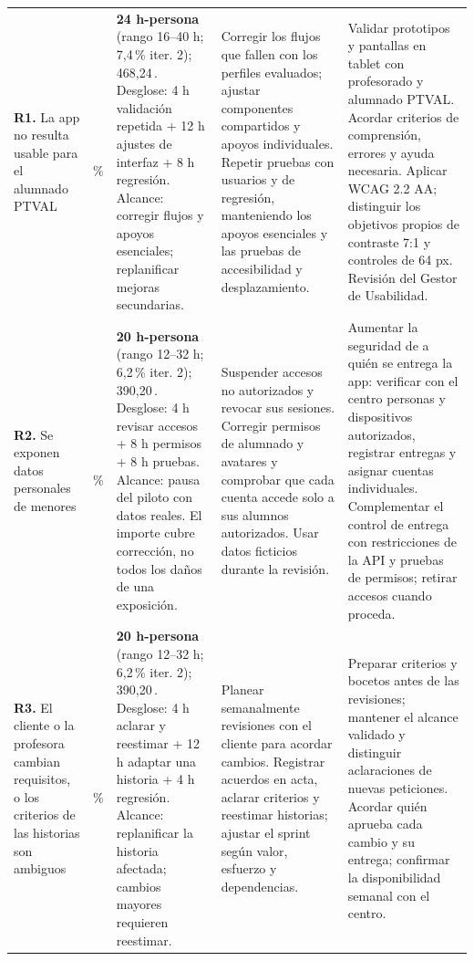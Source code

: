 \documentclass[a4paper,10pt]{article}
\newcommand{\eu}{\,\texteuro}
\begin{document}
\begin{landscape}
{\begin{longtable}{@{}>{\raggedright\arraybackslash}p{3.4cm}>{\raggedleft\arraybackslash}p{2.1cm}>{\raggedright\arraybackslash}p{5.2cm}>{\raggedright\arraybackslash}p{6.55cm}>{\raggedright\arraybackslash}p{6.55cm}@{}}
\textbf{R1.} La app no resulta usable para el alumnado PTVAL
& 50\,\%
& \textbf{24 h-persona} (rango 16--40 h; 7,4\,\% iter. 2); 468,24\eu{}. Desglose: 4 h validación repetida + 12 h ajustes de interfaz + 8 h regresión. Alcance: corregir flujos y apoyos esenciales; replanificar mejoras secundarias.
& Corregir los flujos que fallen con los perfiles evaluados; ajustar componentes compartidos y apoyos individuales. Repetir pruebas con usuarios y de regresión, manteniendo los apoyos esenciales y las pruebas de accesibilidad y desplazamiento.
& Validar prototipos y pantallas en tablet con profesorado y alumnado PTVAL. Acordar criterios de comprensión, errores y ayuda necesaria. Aplicar WCAG 2.2 AA; distinguir los objetivos propios de contraste 7:1 y controles de 64 px. Revisión del Gestor de Usabilidad.
\\

\textbf{R2.} Se exponen datos personales de menores
& 45\,\%
& \textbf{20 h-persona} (rango 12--32 h; 6,2\,\% iter. 2); 390,20\eu{}. Desglose: 4 h revisar accesos + 8 h permisos + 8 h pruebas. Alcance: pausa del piloto con datos reales. El importe cubre corrección, no todos los daños de una exposición.
& Suspender accesos no autorizados y revocar sus sesiones. Corregir permisos de alumnado y avatares y comprobar que cada cuenta accede solo a sus alumnos autorizados. Usar datos ficticios durante la revisión.
& Aumentar la seguridad de a quién se entrega la app: verificar con el centro personas y dispositivos autorizados, registrar entregas y asignar cuentas individuales. Complementar el control de entrega con restricciones de la API y pruebas de permisos; retirar accesos cuando proceda.
\\

\textbf{R3.} El cliente o la profesora cambian requisitos, o los criterios de las historias son ambiguos
& 45\,\%
& \textbf{20 h-persona} (rango 12--32 h; 6,2\,\% iter. 2); 390,20\eu{}. Desglose: 4 h aclarar y reestimar + 12 h adaptar una historia + 4 h regresión. Alcance: replanificar la historia afectada; cambios mayores requieren reestimar.
& Planear semanalmente revisiones con el cliente para acordar cambios. Registrar acuerdos en acta, aclarar criterios y reestimar historias; ajustar el sprint según valor, esfuerzo y dependencias.
& Preparar criterios y bocetos antes de las revisiones; mantener el alcance validado y distinguir aclaraciones de nuevas peticiones. Acordar quién aprueba cada cambio y su entrega; confirmar la disponibilidad semanal con el centro.
\\


\end{longtable}}
\end{landscape}
\end{document}
